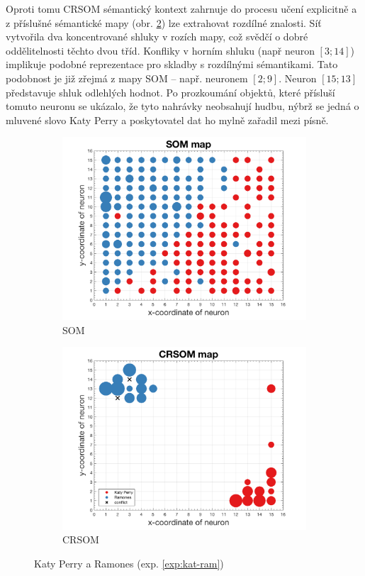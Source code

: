 \documentclass[thesis=M,czech]{FITthesis}[2012/06/26]
\begin{document}
	Oproti tomu CRSOM sémantický kontext zahrnuje do procesu učení explicitně a z příslušné sémantické mapy (obr. \ref{fig:kp_ram_crsom}) lze extrahovat rozdílné znalosti. Síť vytvořila dva koncentrované shluky v rozích mapy, což svědčí o dobré oddělitelnosti těchto dvou tříd. Konfliky v horním shluku (např neuron $[3;14]$) implikuje podobné reprezentace pro skladby s rozdílnými sémantikami. Tato podobnost je již zřejmá z mapy SOM -- např. neuronem $[2;9]$. Neuron $[15;13]$ představuje shluk odlehlých hodnot. Po prozkoumání objektů, které přísluší tomuto neuronu se ukázalo, že tyto nahrávky neobsahují hudbu, nýbrž se jedná o mluvené slovo Katy Perry a poskytovatel dat ho mylně zařadil mezi písně.

\begin{figure}
\centering
\begin{subfigure}{.5\textwidth}
  \centering
  \includegraphics[width=.99\linewidth]{exp_kp_ram_som.png}
  \caption{SOM}
  \label{fig:kp_ram_som}
\end{subfigure}%
\begin{subfigure}{.5\textwidth}
  \centering
  \includegraphics[width=.99\linewidth]{exp_kp_ram_crsom.png}
  \caption{CRSOM}
  \label{fig:kp_ram_crsom}
\end{subfigure}
\caption{Katy Perry a Ramones (exp. \ref{exp:kat-ram})}
\label{fig:kp_ram_res}
\end{figure}
\end{document}
